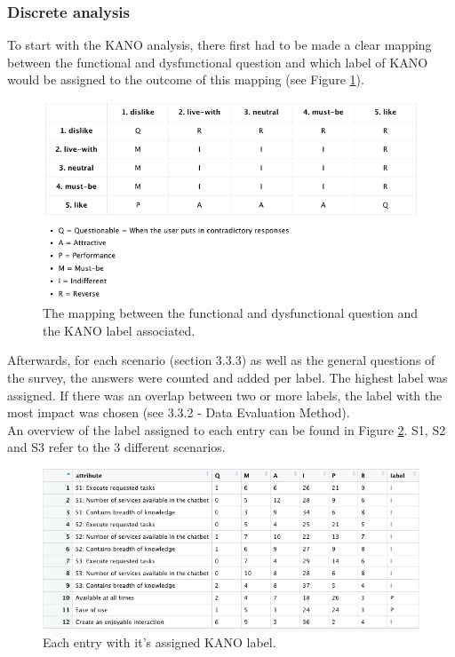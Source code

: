 \subsubsection{Discrete analysis}
To start with the KANO analysis, there first had to be made a clear mapping between the functional and dysfunctional question and which label of KANO would be assigned to the outcome of this mapping (see Figure \ref{fig:kanoOverview}).
\begin{figure}[htb!]
	\centering
	\includegraphics[width=\linewidth]{../LaTeX/Figures/Kano/KANOOverview.png}
	\caption{The mapping between the functional and dysfunctional question and the KANO label associated.}
	\label{fig:kanoOverview}
\end{figure}
\break
Afterwards, for each scenario (section 3.3.3) as well as the general questions of the survey, the answers were counted and added per label. The highest label was assigned. If there was an overlap between two or more labels, the label with the most impact was chosen (see 3.3.2 - Data Evaluation Method).\\
An overview of the label assigned to each entry can be found in Figure \ref{fig:kanoTable}. S1, S2 and S3 refer to the 3 different scenarios.
\begin{figure}[!htb]
	\centering
	\includegraphics[width=\linewidth]{../LaTeX/Figures/Kano/KanoTable.png}
	\caption{Each entry with it's assigned KANO label.}
	\label{fig:kanoTable}
\end{figure}
